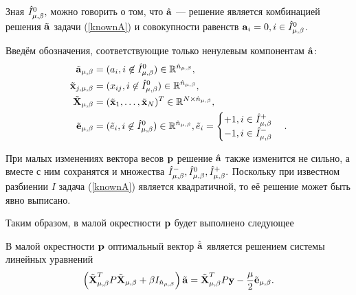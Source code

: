 Зная $\hat I^0_{\mu,\beta},$ можно говорить о том, что $\hat{\boldsymbol{\mathbf{a}}}$ --- решение является комбинацией решения $\tilde{{\boldsymbol{\mathbf{a}}}}$ задачи (\ref{knownA}) и совокупности равенств $\boldsymbol{\mathbf{a}}_i = 0, i\in \hat I^0_{\mu,\beta}$.

Введём обозначения, соответствующие только ненулевым компонентам $\hat{\boldsymbol{\mathbf{a}}}$:
\begin{align*}
	\tilde{\boldsymbol{\mathbf{a}}}_{\mu,\beta} &= (a_i, i\not\in \hat I^0_{\mu,\beta}) \in \mathbb{R}^{\hat n_{\mu,\beta}}, \\
	\tilde{\boldsymbol{\mathbf{x}}}_{j,{\mu,\beta}} &= (x_{ij}, i\not\in \hat I^0_{\mu,\beta}) \in \mathbb{R}^{\hat n_{\mu,\beta}}, \\
	\tilde{\boldsymbol{\mathbf{X}}}_{\mu,\beta} &= (\tilde{\boldsymbol{\mathbf{x}}}_1, \ldots, \tilde{\boldsymbol{\mathbf{x}}}_N)^T \in \mathbb{R}^{N \times \hat n_{\mu,\beta}}, \\
	\tilde{\boldsymbol{\mathbf{e}}}_{\mu,\beta} &= (\tilde e_i, i\not\in \hat I^0_{\mu,\beta}) \in \mathbb{R}^{\hat n_{\mu,\beta}},
		\tilde e_i = \begin{cases}+1, i \in \hat I^+_{\mu,\beta} \\-1, i \in \hat I^-_{\mu,\beta}\end{cases}.
\end{align*}

При малых изменениях вектора весов $\boldsymbol{\mathbf{p}}$ решение $\hat{\boldsymbol{\mathbf{a}}}$ также изменится не сильно, а вместе с ним сохранятся и множества $\hat I^-_{\mu,\beta}, \hat I^0_{\mu,\beta}, \hat I^+_{\mu,\beta}.$ Поскольку при известном разбиении $I$ задача (\ref{knownA}) является квадратичной, то её решение может быть явно выписано.

Таким образом, в малой окрестности $\boldsymbol{\mathbf{p}}$ будет выполнено следующее

\begin{statement}
\label{stmnt:locally_linear}
В малой окрестности $\boldsymbol{\mathbf{p}}$ оптимальный вектор $\hat{\tilde{\mathbf a}}$ является решением системы линейных уравнений
\begin{equation*}
	\left(\tilde{\boldsymbol{\mathbf{X}}}^T_{\mu,\beta} P\tilde{\boldsymbol{\mathbf{X}}}_{\mu,\beta} + \beta I_{\hat n_{\mu,\beta}}\right) \tilde{\boldsymbol{\mathbf{a}}}
		= \tilde{\boldsymbol{\mathbf{X}}}^T_{\mu,\beta} P \boldsymbol{\mathbf{y}} -\frac\mu2\tilde{\boldsymbol{\mathbf{e}}}_{\mu,\beta}.
\end{equation*}
\end{statement}


